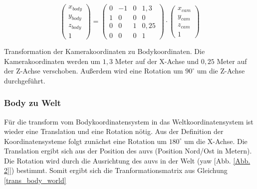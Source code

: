 \begin{ownequation}[H]
\begin{equation}
\begin{pmatrix}
x_{body}\\y_{body}\\z_{body}\\1
\end{pmatrix}
=
\begin{pmatrix}
0 & -1 & 0& 1,3\\
1 & 0 & 0& 0\\
0 & 0 & 1& 0,25\\
0 & 0 & 0 & 1
\end{pmatrix}
\cdot
\begin{pmatrix}
x_{cam}\\y_{cam}\\z_{cam}\\1
\end{pmatrix}
\end{equation}
\caption[\gls{transform} der Kamerakoordinaten zu Bodykoordinaten]{Transformation der Kamerakoordinaten zu Bodykoordinaten. Die Kamerakoordinaten werden um $1,3$ Meter auf der X-Achse und $0,25$ Meter auf der Z-Achse verschoben. Außerdem wird eine Rotation um $90^\circ$ um die Z-Achse durchgeführt.}
\label{trans_cam_body}
\end{ownequation}

\subsubsection{Body zu Welt}
Für die \gls{transform} vom Bodykoordinatensystem in das Weltkoordinatensystem ist wieder eine Translation und eine Rotation nötig.
Aus der Definition der Koordinatensysteme folgt zunächst eine Rotation um $180^\circ$ um die X-Achse.
Die Translation ergibt sich aus der Position des \gls{auv}s (Position Nord/Ost in Metern).\\
Die Rotation wird durch die Ausrichtung des \gls{auv}s in der Welt (\gls{yaw} [Abb. \ref{Abb. 2}]) bestimmt. Somit ergibt sich die Tranformationsmatrix aus Gleichung \ref{trans_body_world}\\

